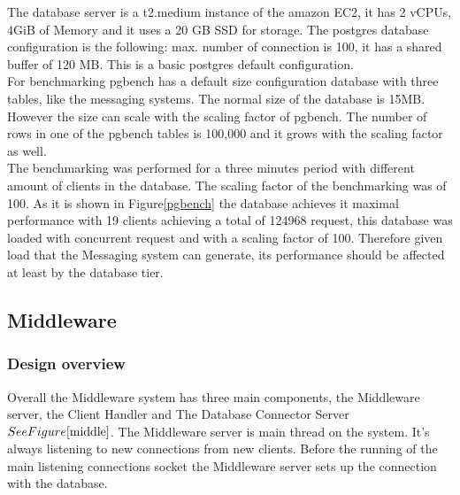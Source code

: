 The database server is a t2.medium instance of the amazon EC2, it has 2 vCPUs, 4GiB of Memory and it uses a 20 GB SSD for storage. The postgres database configuration is the following: max. number of connection is 100, it has a shared buffer of 120 MB. This is a basic postgres default configuration.\\	

For benchmarking pgbench has a default size configuration database with three tables, like the messaging systems. The normal size of the database is 15MB. However the size can scale with the scaling factor of pgbench. The number of rows in one of the pgbench tables is 100,000 and it grows with the scaling factor as well.\\

The benchmarking was performed for a three minutes period with different amount of clients in the database. The scaling factor of the benchmarking was of 100. 
As it is shown in Figure\ref{pgbench} the database achieves it maximal performance with 19 clients achieving a total of 124968 request, this database was loaded with concurrent request and with a scaling factor of 100. Therefore given load that the Messaging system can generate, its performance should be affected at least by the database tier.\\



\subsection{Middleware}\label{sec:middleware}

\subsubsection{Design overview}\label{sec:design-overview}
Overall the Middleware system has three main components, the Middleware server, the Client Handler and The Database Connector Server \( See Figure \ref{middle} \).
The Middleware server is main thread on the system. It’s always listening to new connections from new clients. Before the running of the main listening connections socket the Middleware server sets up the connection with the database.\\

